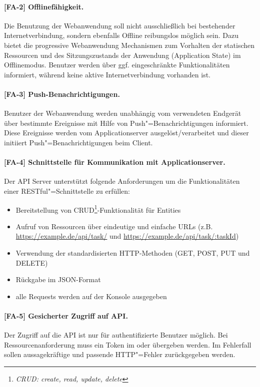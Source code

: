 \paragraph{[FA-2] Offlinefähigkeit.} Die Benutzung der Webanwendung soll nicht ausschließlich bei bestehender Internetverbindung, sondern ebenfalls Offline reibungslos möglich sein. Dazu bietet die progressive Webanwendung Mechanismen zum Vorhalten der statischen Ressourcen und des Sitzungszustands der Anwendung (\glqq Application State\grqq) im Offlinemodus. Benutzer werden über ggf. eingeschränkte Funktionalitäten informiert, während keine aktive Internetverbindung vorhanden ist.

\paragraph{[FA-3] Push-Benachrichtigungen.} Benutzer der Webanwendung werden unabhängig vom verwendeten Endgerät über bestimmte Ereignisse mit Hilfe von Push"=Benachrichtigungen informiert. Diese Ereignisse werden vom Applicationserver ausgelöst/verarbeitet und dieser initiiert Push"=Benachrichtigungen beim Client. 

\paragraph{[FA-4] Schnittstelle für Kommunikation mit Applicationserver.} Der API Server unterstützt folgende Anforderungen um die Funktionalitäten einer RESTful"=Schnittstelle zu erfüllen:

\begin{itemize}
\setlength{\itemsep}{0pt}%
\setlength{\parskip}{0pt}%
\item Bereitstellung von CRUD\footnote{\textit{CRUD: create, read, update, delete}}-Funktionalität für Entities
\item Aufruf von Ressourcen über eindeutige und einfache URLs (z.B. \url{https://example.de/api/task/} und \url{https://example.de/api/task/:taskId}) 
\item Verwendung der standardisierten HTTP-Methoden (GET, POST, PUT und DELETE) 
\item Rückgabe im JSON-Format
\item alle Requests werden auf der Konsole ausgegeben
\end{itemize}  

\paragraph{[FA-5] Gesicherter Zugriff auf API.} Der Zugriff auf die API ist nur für authentifizierte Benutzer möglich. Bei Ressourcenanforderung muss ein Token im  oder  übergeben werden. Im Fehlerfall sollen aussagekräftige und passende HTTP"=Fehler zurückgegeben werden.

